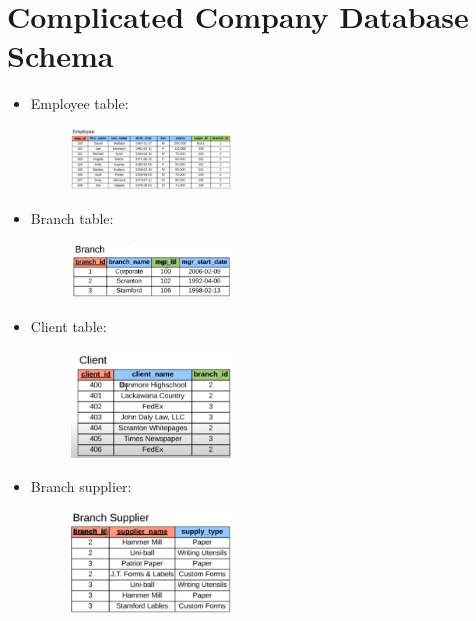 \section{Complicated Company Database Schema}
\begin{itemize}
    \item Employee table:
        \begin{figure}[H]
            \centering
            \includegraphics[width=0.4\textwidth]{./figs/employee.png}
        \end{figure}
    
    \item Branch table:
        \begin{figure}[H]
            \centering
            \includegraphics[width=0.4\textwidth]{./figs/branch.png}
        \end{figure}
    
    \item Client table:
        \begin{figure}[H]
            \centering
            \includegraphics[width=0.4\textwidth]{./figs/client.png}
        \end{figure}
    
    \item Branch supplier:
        \begin{figure}[H]
            \centering
            \includegraphics[width=0.4\textwidth]{./figs/branch_sup}
        \end{figure}
    

\end{itemize}
